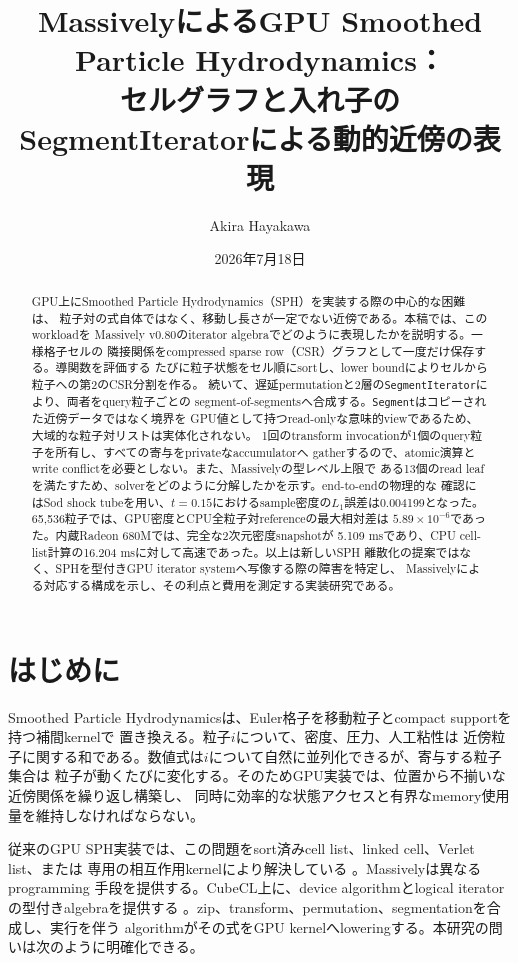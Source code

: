 \documentclass[a4paper,10pt]{ltjsarticle}
\title{MassivelyによるGPU Smoothed Particle Hydrodynamics：\\
セルグラフと入れ子のSegmentIteratorによる動的近傍の表現}
\author{Akira Hayakawa}
\date{2026年7月18日}
\newcommand{\code}[1]{\texttt{#1}}
\begin{document}
\maketitle

\begin{abstract}
GPU上にSmoothed Particle Hydrodynamics（SPH）を実装する際の中心的な困難は、
粒子対の式自体ではなく、移動し長さが一定でない近傍である。本稿では、このworkloadを
Massively v0.80のiterator algebraでどのように表現したかを説明する。一様格子セルの
隣接関係をcompressed sparse row（CSR）グラフとして一度だけ保存する。導関数を評価する
たびに粒子状態をセル順にsortし、lower boundによりセルから粒子への第2のCSR分割を作る。
続いて、遅延permutationと2層の\code{SegmentIterator}により、両者をquery粒子ごとの
segment-of-segmentsへ合成する。\code{Segment}はコピーされた近傍データではなく境界を
GPU値として持つread-onlyな意味的viewであるため、大域的な粒子対リストは実体化されない。
1回のtransform invocationが1個のquery粒子を所有し、すべての寄与をprivateなaccumulatorへ
gatherするので、atomic演算とwrite conflictを必要としない。また、Massivelyの型レベル上限で
ある13個のread leafを満たすため、solverをどのように分解したかを示す。end-to-endの物理的な
確認にはSod shock tubeを用い、$t=0.15$におけるsample密度の$L_1$誤差は0.004199となった。
65,536粒子では、GPU密度とCPU全粒子対referenceの最大相対差は
$5.89\times10^{-6}$であった。内蔵Radeon 680Mでは、完全な2次元密度snapshotが
5.109 msであり、CPU cell-list計算の16.204 msに対して高速であった。以上は新しいSPH
離散化の提案ではなく、SPHを型付きGPU iterator systemへ写像する際の障害を特定し、
Massivelyによる対応する構成を示し、その利点と費用を測定する実装研究である。
\end{abstract}

\section{はじめに}

Smoothed Particle Hydrodynamicsは、Euler格子を移動粒子とcompact supportを持つ補間kernelで
置き換える\citep{gingold1977,monaghan1992}。粒子$i$について、密度、圧力、人工粘性は
近傍粒子に関する和である。数値式は$i$について自然に並列化できるが、寄与する粒子集合は
粒子が動くたびに変化する。そのためGPU実装では、位置から不揃いな近傍関係を繰り返し構築し、
同時に効率的な状態アクセスと有界なmemory使用量を維持しなければならない。

従来のGPU SPH実装では、この問題をsort済みcell list、linked cell、Verlet list、または
専用の相互作用kernelにより解決している
\citep{herault2010,dominguez2011,dominguez2013,winkler2018}。Massivelyは異なるprogramming
手段を提供する。CubeCL上に、device algorithmとlogical iteratorの型付きalgebraを提供する
\citep{massively080,cubecl}。zip、transform、permutation、segmentationを合成し、実行を伴う
algorithmがその式をGPU kernelへloweringする。本研究の問いは次のように明確化できる。
\end{document}
